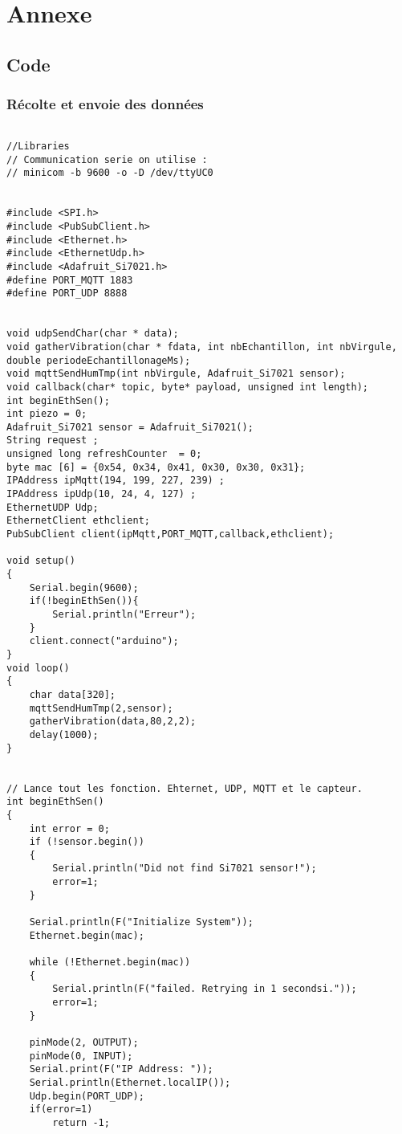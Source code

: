 
\section*{Annexe}
\subsection*{Code}
\subsubsection*{Récolte et envoie des données}
\begin{scriptsize}
\begin{lstlisting}

//Libraries
// Communication serie on utilise :
// minicom -b 9600 -o -D /dev/ttyUC0


#include <SPI.h>
#include <PubSubClient.h>
#include <Ethernet.h>
#include <EthernetUdp.h>
#include <Adafruit_Si7021.h>
#define PORT_MQTT 1883
#define PORT_UDP 8888


void udpSendChar(char * data);
void gatherVibration(char * fdata, int nbEchantillon, int nbVirgule, double periodeEchantillonageMs);
void mqttSendHumTmp(int nbVirgule, Adafruit_Si7021 sensor);
void callback(char* topic, byte* payload, unsigned int length);
int beginEthSen();
int piezo = 0;
Adafruit_Si7021 sensor = Adafruit_Si7021();
String request ;
unsigned long refreshCounter  = 0;
byte mac [6] = {0x54, 0x34, 0x41, 0x30, 0x30, 0x31};
IPAddress ipMqtt(194, 199, 227, 239) ;
IPAddress ipUdp(10, 24, 4, 127) ;
EthernetUDP Udp;
EthernetClient ethclient; 
PubSubClient client(ipMqtt,PORT_MQTT,callback,ethclient); 

void setup() 
{
	Serial.begin(9600);
	if(!beginEthSen()){
		Serial.println("Erreur");
	}
	client.connect("arduino");
}
void loop() 
{
	char data[320];
	mqttSendHumTmp(2,sensor);
	gatherVibration(data,80,2,2);
	delay(1000);
}


// Lance tout les fonction. Ehternet, UDP, MQTT et le capteur. 
int beginEthSen()
{
	int error = 0;
	if (!sensor.begin()) 
	{
		Serial.println("Did not find Si7021 sensor!");
		error=1;
	}

	Serial.println(F("Initialize System"));
	Ethernet.begin(mac);

	while (!Ethernet.begin(mac)) 
	{
		Serial.println(F("failed. Retrying in 1 secondsi."));
		error=1;
	}

	pinMode(2, OUTPUT);
	pinMode(0, INPUT);
	Serial.print(F("IP Address: "));
	Serial.println(Ethernet.localIP());
	Udp.begin(PORT_UDP);
	if(error=1)
		return -1;


\end{lstlisting}
\end{scriptsize}

